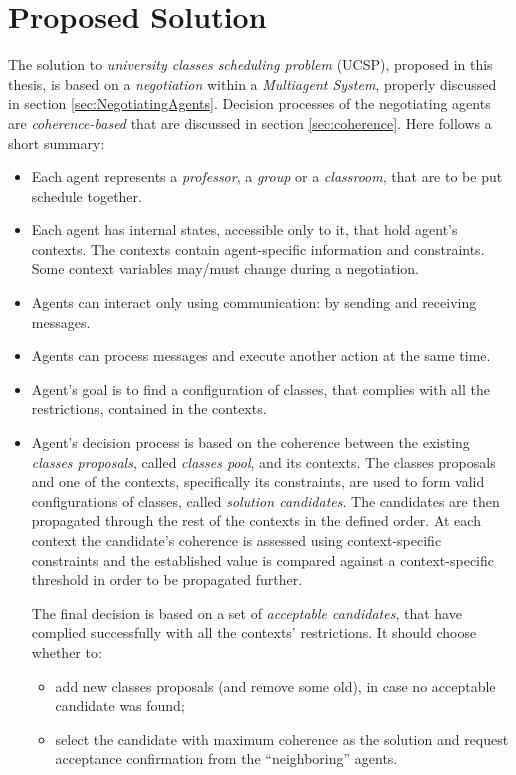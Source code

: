 \section{Proposed Solution}
\medskip


\def\ctx{\mathit{ctx}}
\def\codom{\mathrm{codomain}}
\def\maybe{\mathrm{Maybe~}}


\noindent
The solution to \emph{university classes scheduling problem} (UCSP), proposed
in this thesis, is based on a \emph{negotiation} within a \emph{Multiagent System},
properly discussed in section \ref{sec:NegotiatingAgents}.
Decision processes of the negotiating agents are \emph{coherence-based}
that are discussed in section \ref{sec:coherence}.
Here follows a short summary:
\begin{itemize}
  \item Each agent represents a \emph{professor}, a \emph{group} or a \emph{classroom},
    that are to be put schedule together.
  \item Each agent has internal states, accessible only to it, that hold
    agent's contexts. The contexts contain agent-specific information and constraints.
    Some context variables may/must change during a negotiation.
  \item Agents can interact only using communication: by sending and receiving messages.
  \item Agents can process messages and execute another action at the same time.
  \item Agent's goal is to find a configuration of classes, that complies with
    all the restrictions, contained in the contexts.
  \item Agent's decision process is based on the coherence between the existing
      \emph{classes proposals}, called \emph{classes pool}, and its contexts.
      The classes proposals and one of the contexts, specifically its constraints,
      are used to form valid configurations of classes, called \emph{solution candidates}.
      The candidates are then propagated through the rest of the contexts in the
      defined order. At each context the candidate's coherence is assessed using
      context-specific constraints and the established value is compared against
      a context-specific threshold in order to be propagated further.

      The final decision is based on a set of \emph{acceptable candidates}, that
      have complied successfully with all the contexts' restrictions. It should
      choose whether to:
      \begin{itemize}
        \item add new classes proposals (and remove some old), in case no
          acceptable candidate was found;
        \item select the candidate with maximum coherence as the solution and
          request acceptance confirmation from the ``neighboring'' agents.
      \end{itemize}


\end{itemize}

